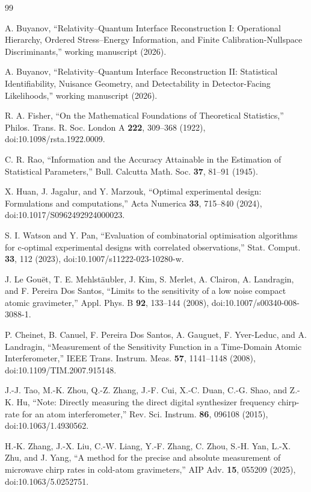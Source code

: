\begin{thebibliography}{99}

A. Buyanov,
``Relativity--Quantum Interface Reconstruction I: Operational Hierarchy, Ordered Stress--Energy Information, and Finite Calibration-Nullspace Discriminants,''
working manuscript (2026).

A. Buyanov,
``Relativity--Quantum Interface Reconstruction II: Statistical Identifiability, Nuisance Geometry, and Detectability in Detector-Facing Likelihoods,''
working manuscript (2026).

R. A. Fisher,
``On the Mathematical Foundations of Theoretical Statistics,''
Philos. Trans. R. Soc. London A \textbf{222}, 309--368 (1922),
doi:10.1098/rsta.1922.0009.

C. R. Rao,
``Information and the Accuracy Attainable in the Estimation of Statistical Parameters,''
Bull. Calcutta Math. Soc. \textbf{37}, 81--91 (1945).

X. Huan, J. Jagalur, and Y. Marzouk,
``Optimal experimental design: Formulations and computations,''
Acta Numerica \textbf{33}, 715--840 (2024),
doi:10.1017/S0962492924000023.

S. I. Watson and Y. Pan,
``Evaluation of combinatorial optimisation algorithms for c-optimal experimental designs with correlated observations,''
Stat. Comput. \textbf{33}, 112 (2023),
doi:10.1007/s11222-023-10280-w.

J. Le Gou\"et, T. E. Mehlst\"aubler, J. Kim, S. Merlet, A. Clairon, A. Landragin, and F. Pereira Dos Santos,
``Limits to the sensitivity of a low noise compact atomic gravimeter,''
Appl. Phys. B \textbf{92}, 133--144 (2008),
doi:10.1007/s00340-008-3088-1.

P. Cheinet, B. Canuel, F. Pereira Dos Santos, A. Gauguet, F. Yver-Leduc, and A. Landragin,
``Measurement of the Sensitivity Function in a Time-Domain Atomic Interferometer,''
IEEE Trans. Instrum. Meas. \textbf{57}, 1141--1148 (2008),
doi:10.1109/TIM.2007.915148.

J.-J. Tao, M.-K. Zhou, Q.-Z. Zhang, J.-F. Cui, X.-C. Duan, C.-G. Shao, and Z.-K. Hu,
``Note: Directly measuring the direct digital synthesizer frequency chirp-rate for an atom interferometer,''
Rev. Sci. Instrum. \textbf{86}, 096108 (2015),
doi:10.1063/1.4930562.

H.-K. Zhang, J.-X. Liu, C.-W. Liang, Y.-F. Zhang, C. Zhou, S.-H. Yan, L.-X. Zhu, and J. Yang,
``A method for the precise and absolute measurement of microwave chirp rates in cold-atom gravimeters,''
AIP Adv. \textbf{15}, 055209 (2025),
doi:10.1063/5.0252751.


\end{thebibliography}

